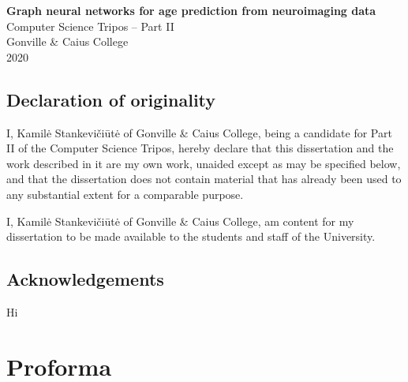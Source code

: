 \pagestyle{empty}
\thispagestyle{empty}


\vspace*{60mm}
\begin{center}
\Large
\textbf{Graph neural networks for age prediction from neuroimaging data} \\[5mm]
\large
Computer Science Tripos -- Part II \\[5mm]
Gonville \& Caius College \\[5mm]
2020
\end{center}


\pagestyle{plain}
\newpage
\section*{Declaration of originality}

I, Kamilė Stankevičiūtė of Gonville \& Caius College, being a candidate for Part II of the Computer Science Tripos, hereby declare that this dissertation and the work described in it are my own work, unaided except as may be specified below, and that the dissertation does not contain material that has already been used to any substantial extent for a comparable purpose.

I, Kamilė Stankevičiūtė of Gonville \& Caius College, am content for my dissertation to be made available to the students and staff of the University.

\bigskip
{}

\medskip
{}

\section*{Acknowledgements}

Hi


\chapter*{Proforma}

